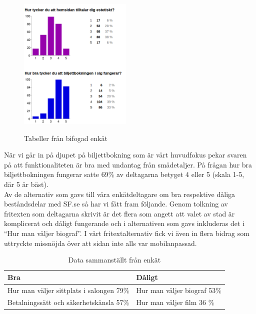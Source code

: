 \documentclass[swedish,a4paper,11pt]{article}
\begin{document}
\noindent
\begin{figure}
  \begin{centering}
    \includegraphics[width=0.48\textwidth]{charts.png}\\
  \end{centering}
  \caption{Tabeller från bifogad enkät}
\end{figure}

När vi går in på djupet på biljettbokning som är vårt huvudfokus pekar svaren på att funktionaliteten är bra med undantag från smådetaljer. På frågan hur bra biljettbokningen fungerar satte 69\% av deltagarna betyget 4 eller 5 (skala 1-5, där 5 är bäst).\\

Av de alternativ som gavs till våra enkätdeltagare om bra respektive dåliga beståndsdelar med SF.se så har vi fått fram följande. Genom tolkning av fritexten som deltagarna skrivit är det flera som angett att valet av stad är komplicerat och dåligt fungerande och i alternativen som gavs inkluderas det i “Hur man väljer biograf”. I vårt fritextalternativ fick vi även in flera bidrag som uttryckte missnöjda över att sidan inte alls var mobilanpassad.\\
\begin{center}
\begin{table}[h]
    \begin{tabularx}{0.9\textwidth}{|X|X|}
    \hline
    \rowcolor[HTML]{32CB00}
    Bra                                      & \cellcolor[HTML]{FF0000} Dåligt  \\[2ex] \hline
    Hur man väljer sittplats i salongen 79\% & Hur man väljer biograf 53\% \\[2ex] \hline
    Betalningssätt och säkerhetskänsla  57\% & Hur man väljer film 36 \%   \\[2ex] \hline
    \end{tabularx}
\caption{Data sammanställt från enkät}
\end{table}
\end{center}
\end{document}
